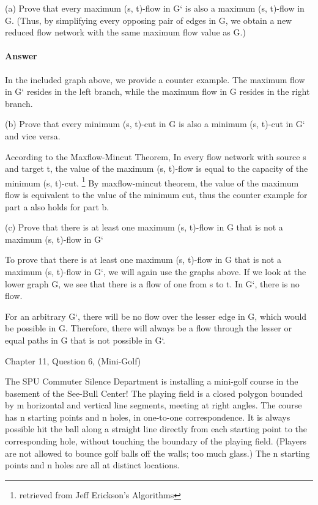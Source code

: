 \documentclass{article}
\begin{document}
(a) Prove that every maximum (s, t)-flow in G` is also a maximum (s, t)-flow
in G. (Thus, by simplifying every opposing pair of edges in G, we obtain
a new reduced flow network with the same maximum flow value as G.)

\paragraph{Answer} In the included graph above, we provide a counter example. The maximum flow in G` resides in the left branch, while the maximum flow in G resides in the right branch.

(b) Prove that every minimum (s, t)-cut in G is also a minimum (s, t)-cut
in G` and vice versa.

According to the Maxflow-Mincut Theorem, In every flow network with source s and
target t, the value of the maximum (s, t)-flow is equal to the capacity of the
minimum (s, t)-cut. \footnote{retrieved from Jeff Erickson's Algorithms} By maxflow-mincut theorem, the value of the maximum flow is equivalent to the value of the minimum cut, thus the counter example for part a also holds for part b.

(c) Prove that there is at least one maximum (s, t)-flow in G that is not a
maximum (s, t)-flow in G`

To prove that there is at least one maximum (s, t)-flow in G that is not a maximum (s, t)-flow in G`, we will again use the graphs above. If we look at the lower graph G, we see that there is a flow of one from s to t. In G`, there is no flow.

For an arbitrary G`, there will be no flow over the lesser edge in G, which would be possible in G. Therefore, there will always be a flow through the lesser or equal paths in G that is not possible in G`.

\collab{}
\nextprob{}

Chapter 11, Question 6, (Mini-Golf)

The SPU Commuter Silence Department is installing a mini-golf course in
the basement of the See-Bull Center! The playing field is a closed polygon
bounded by m horizontal and vertical line segments, meeting at right angles.
The course has n starting points and n holes, in one-to-one correspondence.
It is always possible hit the ball along a straight line directly from each
starting point to the corresponding hole, without touching the boundary
of the playing field. (Players are not allowed to bounce golf balls off the
walls; too much glass.) The n starting points and n holes are all at distinct
locations.
\end{document}
